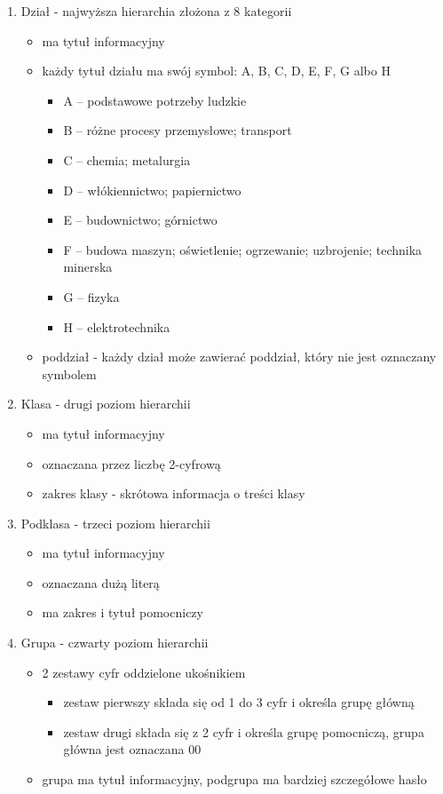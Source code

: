 \begin{enumerate}
    \item Dział - najwyższa hierarchia złożona z 8 kategorii
    \begin{itemize}
        \item ma tytuł informacyjny
        \item każdy tytuł działu ma swój symbol: A, B, C, D, E, F, G albo H
        \begin{itemize}
            \item A – podstawowe potrzeby ludzkie
            \item B – różne procesy przemysłowe; transport
            \item C – chemia; metalurgia
            \item D – włókiennictwo; papiernictwo
            \item E – budownictwo; górnictwo
            \item F – budowa maszyn; oświetlenie; ogrzewanie; uzbrojenie; technika minerska
            \item G – fizyka
            \item H – elektrotechnika
        \end{itemize}
        \item poddział - każdy dział może zawierać poddział, który nie jest oznaczany symbolem
    \end{itemize}
    \item Klasa - drugi poziom hierarchii
    \begin{itemize}
        \item ma tytuł informacyjny
        \item oznaczana przez liczbę 2-cyfrową
        \item zakres klasy - skrótowa informacja o treści klasy
    \end{itemize}
    \item Podklasa - trzeci poziom hierarchii
    \begin{itemize}
        \item ma tytuł informacyjny
        \item oznaczana dużą literą
        \item ma zakres i tytuł pomocniczy
    \end{itemize}
    \item Grupa - czwarty poziom hierarchii
    \begin{itemize}
        \item 2 zestawy cyfr oddzielone ukośnikiem
        \begin{itemize}
            \item zestaw pierwszy składa się od 1 do 3 cyfr i określa grupę główną
            \item zestaw drugi składa się z 2 cyfr i określa grupę pomocniczą, grupa główna jest oznaczana 00
        \end{itemize}
        \item grupa ma tytuł informacyjny, podgrupa ma bardziej szczegółowe hasło
    \end{itemize}
\end{enumerate}



